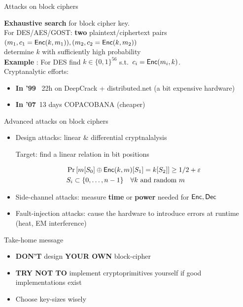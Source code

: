 \documentclass[usenames,dvipsnames, 9pt]{beamer}
\begin{document}
\begin{frame}{Attacks on block ciphers}

\Large
{\color{Orange}\textbf{Exhaustive search}}  for block cipher key. \\[5pt]
	
	For DES/AES/GOST: \textbf{two} plaintext/ciphertext pairs $(m_1, c_1 = \textsf{Enc}(k, m_1)), (m_2, c_2=\textsf{Enc}(k,m_2))$ \\ determine $k$ with sufficiently high probability \\[10pt]
	
	
{\color{Orange}\textbf{Example}}  : For DES find $k \in \{0,1\}^{56}$	s.t.\ $c_i = \textsf{Enc}(m_i, k)$. \\[10pt]

Cryptanalytic efforts: \\
\begin{itemize}
	\item {\color{Orange}\textbf{In '99}} ~22h on  DeepCrack + distributed.net (a bit expensive hardware)\\
	\item {\color{Orange}\textbf{In '07}}~13 days COPACOBANA (cheaper)
\end{itemize}
\end{frame}

\begin{frame}{Advanced attacks on block ciphers}
\LARGE
\begin{itemize}
	\itemsep 1em
	\item Design attacks: linear \& differential cryptnalalysis 
	
	Target:  find a linear relation in bit positions
	
	\begin{align*}
	& \Pr \left[ m[S_0] \oplus \textsf{Enc}(k, m)[S_1 ] = k[S_2]  \right]  \geq 1/2 + \varepsilon  \\
	& S_i \subset \{0,\ldots, n-1\} \quad \forall k \text { and random } m
	\end{align*}
	\pause
	
	\item Side-channel attacks:
	\Large{measure {\color{Orange}\textbf{time}} or {\color{Orange}\textbf{power}} needed for  $\textsf{Enc}, \textsf{Dec}$ } \pause
	\LARGE
	\item Fault-injection attacks: 
	\Large cause the hardware to introduce errors at runtime (heat, EM interference)
\end{itemize}
\end{frame}

\begin{frame}{Take-home message}
\Huge

\begin{itemize}
	\itemsep 2em
	\item {\color{Orange}\textbf{DON'T}} design {\color{Orange}\textbf{YOUR OWN}} block-cipher 
	\item {\color{Orange}\textbf{TRY NOT TO}}  implement cryptoprimitives yourself if good implementations exist
	\item Choose key-sizes wisely 
\end{itemize}
\end{frame}
\end{document}
